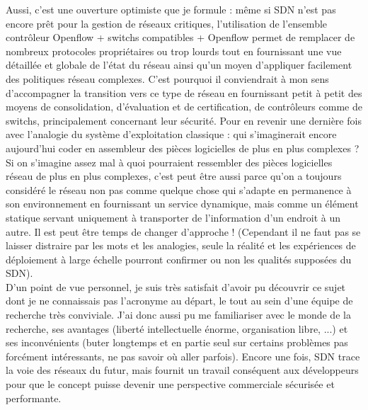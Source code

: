 Aussi, c'est une ouverture optimiste que je formule : même si SDN n'est pas encore prêt pour la gestion de réseaux critiques, l'utilisation de l'ensemble contrôleur Openflow + switchs compatibles + Openflow permet de remplacer de nombreux protocoles propriétaires ou trop lourds tout en fournissant une vue détaillée et globale de l'état du réseau ainsi qu'un moyen d'appliquer facilement des politiques réseau complexes. C'est pourquoi il conviendrait à mon sens d'accompagner la transition vers ce type de réseau en fournissant petit à petit des moyens de consolidation, d'évaluation et de certification, de contrôleurs comme de switchs, principalement concernant leur sécurité. Pour en revenir une dernière fois avec l'analogie du système d'exploitation classique : qui s'imaginerait encore aujourd'hui coder en assembleur des pièces logicielles de plus en plus complexes ? Si on s'imagine assez mal à quoi pourraient ressembler des pièces logicielles réseau de plus en plus complexes, c'est peut être aussi parce qu'on a toujours considéré le réseau non pas comme quelque chose qui s'adapte en permanence à son environnement en fournissant un service dynamique, mais comme un élément statique servant uniquement à transporter de l'information d'un endroit à un autre. Il est peut être temps de changer d'approche ! (Cependant il ne faut pas se laisser distraire par les mots et les analogies, seule la réalité et les expériences de déploiement à large échelle pourront confirmer ou non les qualités supposées du SDN).\\

D’un point de vue personnel, je suis très satisfait d'avoir pu découvrir ce sujet dont je ne connaissais pas l'acronyme au départ, le tout au sein d'une équipe de recherche très conviviale. J'ai donc aussi pu me familiariser avec le monde de la recherche, ses avantages (liberté intellectuelle énorme, organisation libre, ...) et ses inconvénients (buter longtemps et en partie seul sur certains problèmes pas forcément intéressants, ne pas savoir où aller parfois). Encore une fois, SDN trace la voie des réseaux du futur, mais fournit un travail conséquent aux développeurs pour que le concept puisse devenir une perspective commerciale sécurisée et performante.